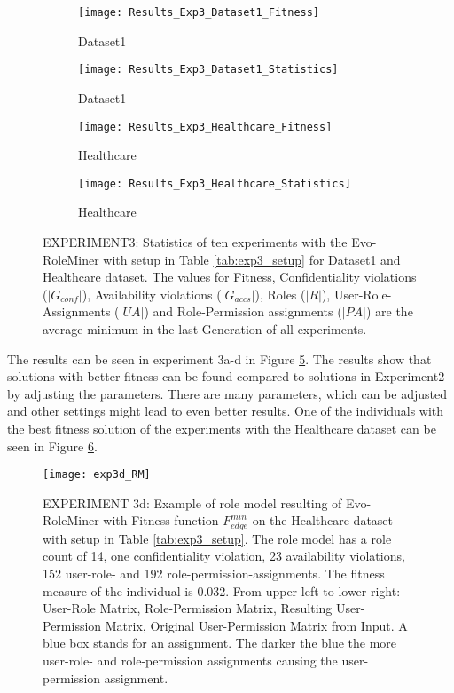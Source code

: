 \begin{figure}[H]
	\centering
	\begin{subfigure}{0.45\textwidth}
		\texttt{[image: Results\_Exp3\_Dataset1\_Fitness]}
		\caption{Dataset1}
		\label{fig:Results_Exp3_Dataset1_Fitness}
	\end{subfigure}%
	\begin{subfigure}{0.55\textwidth}
		\centering
		\texttt{[image: Results\_Exp3\_Dataset1\_Statistics]}
		\caption{Dataset1}
		\label{fig:Results_Exp3_Dataset1_Statistics}
	\end{subfigure}
	\begin{subfigure}{0.45\textwidth}
		\texttt{[image: Results\_Exp3\_Healthcare\_Fitness]}
		\caption{Healthcare}
		\label{fig:Results_Exp3_Healthcare_Fitness}
	\end{subfigure}%
	\begin{subfigure}{0.55\textwidth}
		\centering
		\texttt{[image: Results\_Exp3\_Healthcare\_Statistics]}
		\caption{Healthcare}
		\label{fig:Results_Exp3_Healthcare_Statistics}
	\end{subfigure}
	\caption{EXPERIMENT3: Statistics of ten experiments with the Evo-RoleMiner with setup in Table \ref{tab:exp3_setup} for Dataset1 and Healthcare dataset. The values for Fitness, Confidentiality violations ($|G_{conf}|$), Availability violations ($|G_{accs}|$), Roles ($|R|$), User-Role-Assignments ($|UA|$) and Role-Permission assignments ($|PA|$) are the average minimum in the last Generation of all experiments.}
	\label{fig:Results_Exp3}
\end{figure}

The results can be seen in experiment 3a-d in Figure \ref{fig:Results_Exp3}. The results show that solutions with better fitness can be found compared to solutions in Experiment2 by adjusting the parameters. There are many parameters, which can be adjusted and other settings might lead to even better results. One of the individuals with the best fitness solution of the experiments with the Healthcare dataset can be seen in Figure \ref{fig:exp3d_RM}.

\begin{figure}[H]
	\centering
	\texttt{[image: exp3d\_RM]}
	\caption{EXPERIMENT 3d: Example of role model resulting of Evo-RoleMiner with Fitness function $F_{edge}^{min}$ on the Healthcare dataset with setup in Table \ref{tab:exp3_setup}. The role model has a role count of 14, one confidentiality violation, 23 availability violations, 152 user-role- and 192 role-permission-assignments. The fitness measure of the individual is 0.032. From upper left to lower right: User-Role Matrix, Role-Permission Matrix, Resulting User-Permission Matrix, Original User-Permission Matrix from Input. A blue box stands for an assignment. The darker the blue the more user-role- and role-permission assignments causing the user-permission assignment.}
	\label{fig:exp3d_RM}
\end{figure}

